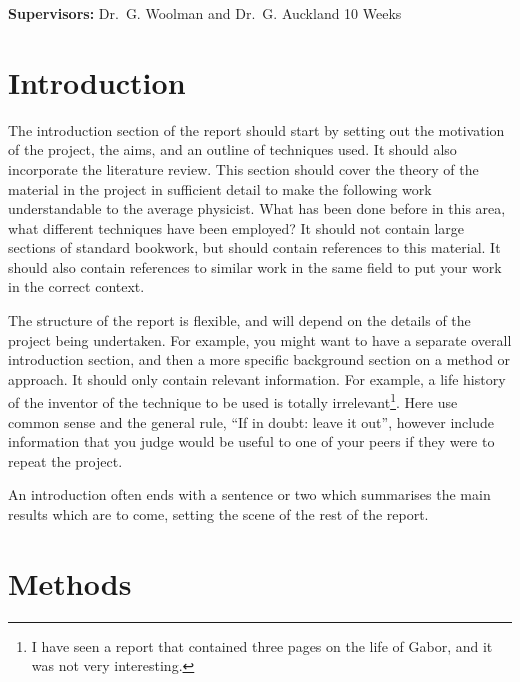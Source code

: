 \documentclass[a4paper,12pt]{article}
\begin{document}
\vfill
{\bf Supervisors:} Dr.\ G. Woolman and Dr.\ G. Auckland                
\hfill
10 Weeks                                        
\newpage
%
\pagestyle{plain}                               %
\setcounter{page}{1}                            %
\tableofcontents                                %
\section{Introduction}

The introduction section of the report should start by setting out the
motivation of the project, the aims, and an outline of techniques used.
It should also incorporate the literature review. This section should 
cover the theory of the material in the project in sufficient detail to 
make the following work understandable to the average physicist. What has 
been done before in this area, what different techniques have been 
employed? It should not contain large sections of standard
bookwork, but should contain references to this material. It should also 
contain references to similar work in the same field to put your work in 
the correct context.

The structure of the report is flexible, and will depend on the details
of the project being undertaken. For example, you might want to have a 
separate overall introduction section, and then a more specific background section 
on a method or approach. It should only contain relevant information. For example, 
a life history of the inventor of the technique to be used is
totally irrelevant\footnote{I have seen a report that contained three pages
on the life of Gabor, and it was not very interesting.}. Here use common sense
and the general rule, ``If in doubt: leave it out'', however
include information that you judge would be useful to one of your
peers if they were to repeat the project.

An introduction often ends with a sentence or two which summarises the main
results which are to come, setting the scene of the rest of the report. 




\section{Methods}
\end{document}
